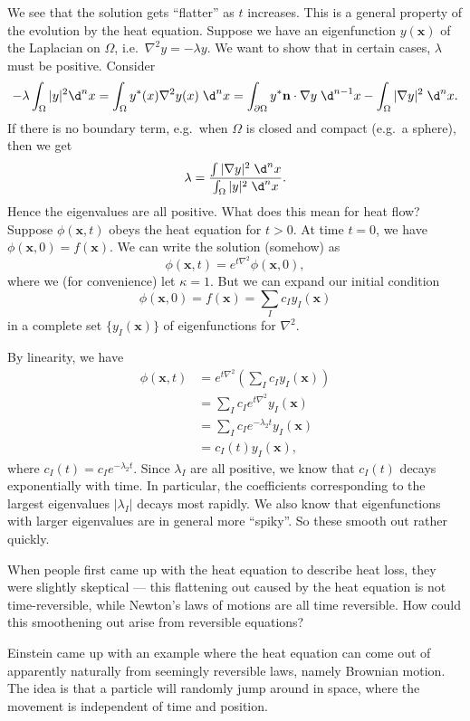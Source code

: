 \documentclass[a4paper]{article}
\begin{document}
We see that the solution gets ``flatter'' as $t$ increases. This is a general property of the evolution by the heat equation. Suppose we have an eigenfunction $y(\mathbf{x})$ of the Laplacian on $\Omega$, i.e.\ $\nabla^2 y = -\lambda y$. We want to show that in certain cases, $\lambda$ must be positive. Consider
\[
  - \lambda \int_\Omega |y|^2 \d^n x = \int_\Omega y^*(x) \nabla^2 y(x)\;\d^n x = \int_{\partial\Omega} y^* \mathbf{n}\cdot \nabla y \;\d^{n - 1}x - \int_\Omega |\nabla y|^2 \;\d^n x.
\]
If there is no boundary term, e.g.\ when $\Omega$ is closed and compact (e.g.\ a sphere), then we get
\[
  \lambda = \frac{\int |\nabla y|^2\;\d^n x}{\int_\Omega |y|^2 \;\d^n x}.
\]
Hence the eigenvalues are all positive. What does this mean for heat flow? Suppose $\phi(\mathbf{x}, t)$ obeys the heat equation for $t > 0$. At time $t = 0$, we have $\phi(\mathbf{x}, 0) = f(\mathbf{x})$. We can write the solution (somehow) as
\[
  \phi(\mathbf{x}, t) = e^{t\nabla^2} \phi(\mathbf{x}, 0),
\]
where we (for convenience) let $\kappa = 1$. But we can expand our initial condition
\[
  \phi(\mathbf{x}, 0) = f(\mathbf{x}) = \sum_I c_I y_I(\mathbf{x})
\]
in a complete set $\{y_I(\mathbf{x})\}$ of eigenfunctions for $\nabla^2$.

By linearity, we have
\begin{align*}
  \phi(\mathbf{x}, t) &= e^{t \nabla^2}\left(\sum_I c_I y_I(\mathbf{x})\right) \\
  &= \sum_I c_I e^{t \nabla^2 }y_I(\mathbf{x}) \\
  &= \sum_I c_I e^{-\lambda_2 t}y_I(\mathbf{x}) \\
  &= c_I(t) y_I(\mathbf{x}),
\end{align*}
where $c_I(t) = c_I e^{-\lambda_2 t}$. Since $\lambda_I$ are all positive, we know that $c_I(t)$ decays exponentially with time. In particular, the coefficients corresponding to the largest eigenvalues $|\lambda_I|$ decays most rapidly. We also know that eigenfunctions with larger eigenvalues are in general more ``spiky''. So these smooth out rather quickly.

When people first came up with the heat equation to describe heat loss, they were slightly skeptical --- this flattening out caused by the heat equation is not time-reversible, while Newton's laws of motions are all time reversible. How could this smoothening out arise from reversible equations?

Einstein came up with an example where the heat equation can come out of apparently naturally from seemingly reversible laws, namely Brownian motion. The idea is that a particle will randomly jump around in space, where the movement is independent of time and position.
\end{document}
